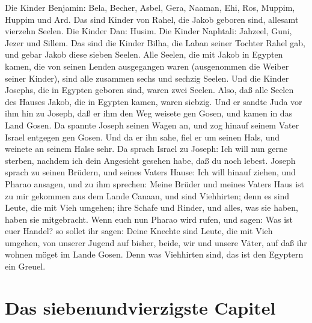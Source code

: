Die Kinder Benjamin: Bela, Becher, Asbel, Gera, Naaman, Ehi, Ros, Muppim, Huppim und Ard. Das sind Kinder von Rahel, die Jakob geboren sind, allesamt vierzehn Seelen. Die Kinder Dan: Husim. Die Kinder Naphtali: Jahzeel, Guni, Jezer und Sillem. Das sind die Kinder Bilha, die Laban seiner Tochter Rahel gab, und gebar Jakob diese sieben Seelen. Alle Seelen, die mit Jakob in Egypten kamen, die von seinen Lenden ausgegangen waren (ausgenommen die Weiber seiner Kinder), sind alle zusammen sechs und sechzig Seelen. Und die Kinder Josephs, die in Egypten geboren sind, waren zwei Seelen. Also, daß alle Seelen des Hauses Jakob, die in Egypten kamen, waren siebzig. Und er sandte Juda vor ihm hin zu Joseph, daß er ihm den Weg weisete gen Gosen, und kamen in das Land Gosen. Da spannte Joseph seinen Wagen an, und zog hinauf seinem Vater Israel entgegen gen Gosen. Und da er ihn sahe, fiel er um seinen Hals, und weinete an seinem Halse sehr. Da sprach Israel zu Joseph: Ich will nun gerne sterben, nachdem ich dein Angesicht gesehen habe, daß du noch lebest. Joseph sprach zu seinen Brüdern, und seines Vaters Hause: Ich will hinauf ziehen, und Pharao ansagen, und zu ihm sprechen: Meine Brüder und meines Vaters Haus ist zu mir gekommen aus dem Lande Canaan, und sind Viehhirten; denn es sind Leute, die mit Vieh umgehen; ihre Schafe und Rinder, und alles, was sie haben, haben sie mitgebracht. Wenn euch nun Pharao wird rufen, und sagen: Was ist euer Handel? so sollet ihr sagen: Deine Knechte sind Leute, die mit Vieh umgehen, von unserer Jugend auf bisher, beide, wir und unsere Väter, auf daß ihr wohnen möget im Lande Gosen. Denn was Viehhirten sind, das ist den Egyptern ein Greuel.

\section{Das siebenundvierzigste Capitel}

